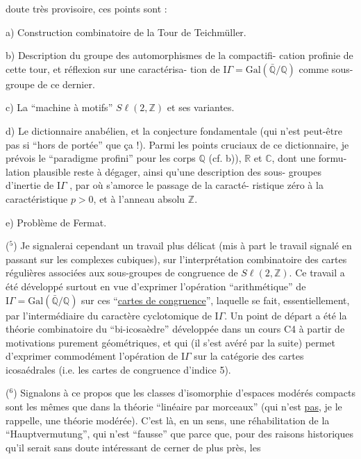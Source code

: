 
doute très provisoire, ces points sont :

a) Construction combinatoire de la Tour de Teichmüller.

b) Description du groupe des automorphismes de la compactifi-%
cation profinie de cette tour, et réflexion sur une caractérisa-%
tion de $\mathrm{I}\!\Gamma = \mathrm{Gal}(\bar{\mathbb{Q}}/\mathbb{Q})$ comme sous-groupe de ce dernier.

c) La ``machine à motifs'' $S\ell(2,\mathbb{Z})$ et ses variantes.

d) Le dictionnaire anabélien, et la conjecture fondamentale
(qui n'est peut-être pas si ``hors de portée'' que ça !). Parmi
les points cruciaux de ce dictionnaire, je prévois le ``paradigme
profini'' pour les corps $\mathbb{Q}$ (cf. b)), $\mathbb{R}$ et $\mathbb{C}$, dont une formu-%
lation plausible reste à dégager, ainsi qu'une description des sous-%
groupes d'inertie de $\mathrm{I}\!\Gamma$ , par où s'amorce le passage de la caracté-%
ristique zéro à la caractéristique $p > 0$, et à l'anneau absolu $\mathbb{Z}$.

e) Problème de Fermat.

($^5$) Je signalerai cependant un travail plus délicat (mis à part
le travail signalé en passant sur les complexes cubiques), sur
l'interprétation combinatoire des cartes régulières associées aux
sous-groupes de congruence de $S\ell(2,\mathbb{Z})$. Ce travail a été développé
surtout en vue d'exprimer l'opération ``arithmétique'' de $\mathrm{I}\!\Gamma = \mathrm{Gal}(\bar{\mathbb{Q}}/\mathbb{Q})$
sur ces ``\uline{cartes de congruence}'', laquelle se fait, essentiellement,
par l'intermédiaire du caractère cyclotomique de $\mathrm{I}\!\Gamma$. Un point de
départ a été la théorie combinatoire du ``bi-icosaèdre'' développée
dans un cours C4 à partir de motivations purement géométriques,
et qui (il s'est avéré par la suite) permet d'exprimer commodément
l'opération de $\mathrm{I}\!\Gamma$ sur la catégorie des cartes icosaédrales (i.e.
les cartes de congruence d'indice 5).

($^6$) Signalons à ce propos que les classes d'isomorphie d'espaces
modérés compacts sont les mêmes que dans la théorie ``linéaire par
morceaux'' (qui n'est \uline{pas}, je le rappelle, une théorie modérée).
C'est là, en un sens, une réhabilitation de la ``Hauptvermutung'',
qui n'est ``fausse'' que parce que, pour des raisons historiques
qu'il serait sans doute intéressant de cerner de plus près, les

